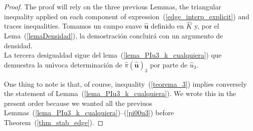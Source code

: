 \begin{proof}
The proof will rely on the three previous Lemmas, 
the triangular inequality applied on each component of 
expression~(\ref{edge_interp_explicit}) and traces inequalities.
Tomamos un campo suave $\hat{\textbf{u}}$ definido en $\hat{K}$ y, por el Lema~(\ref{lemaDensidad}),
la demostración concluirá con un argumento de densidad.\\[5pt]


La tercera desigualdad sigue del lema~(\ref{lema_PIu3_k_cualquiera}) que demuestra la un\'{\i}voca
determinaci\'on de $\hat{\pi}(\hat{\textbf{u}})_3$ por parte de $\hat{u}_3$.

One thing to note is that, of course, inequality~(\ref{teorema_3}) implies conversely 
the statement of Lemma~(\ref{lema_PIu3_k_cualquiera}). We wrote this in the present order
because we wanted all the previuos Lemmas~(\ref{lema_PIu3_k_cualquiera})--(\ref{pi00u3})
before Theorem~(\ref{thm_stab_edge}).


\end{proof}

